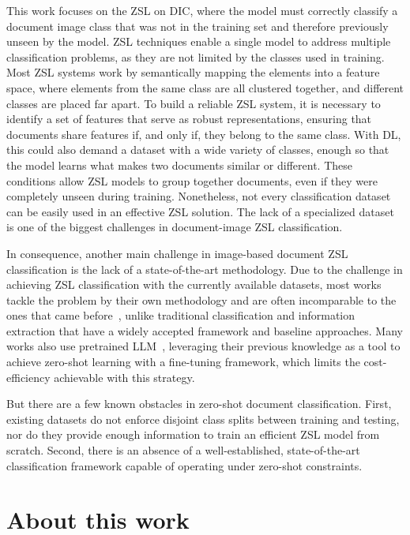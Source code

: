 This work focuses on the \gls{ZSL} on \gls{DIC}, where the model must correctly classify a document image class that was not in the training set and therefore previously unseen by the model. \gls{ZSL} techniques enable a single model to address multiple classification problems, as they are not limited by the classes used in training. Most \gls{ZSL} systems work by semantically mapping the elements into a feature space, where elements from the same class are all clustered together, and different classes are placed far apart. To build a reliable \gls{ZSL} system, it is necessary to identify a set of features that serve as robust representations, ensuring that documents share features if, and only if, they belong to the same class. With \gls{DL}, this could also demand a dataset with a wide variety of classes, enough so that the model learns what makes two documents similar or different. These conditions allow \gls{ZSL} models to group together documents, even if they were completely unseen during training. Nonetheless, not every classification dataset can be easily used in an effective \gls{ZSL} solution. The lack of a specialized dataset is one of the biggest challenges in document-image \gls{ZSL} classification.

In consequence, another main challenge in image-based document \gls{ZSL} classification is the lack of a state-of-the-art methodology. Due to the challenge in achieving \gls{ZSL} classification with the currently available datasets, most works tackle the problem by their own methodology and are often incomparable to the ones that came before~\cite{sinha2024cica}, unlike traditional classification and information extraction that have a widely accepted framework and baseline approaches. Many works also use pretrained \gls{LLM}~\cite{scius2024zeroshot}, leveraging their previous knowledge as a tool to achieve zero-shot learning with a fine-tuning framework, which limits the cost-efficiency achievable with this strategy.

But there are a few known obstacles in zero-shot document classification. First, existing datasets do not enforce disjoint class splits between training and testing, nor do they provide enough information to train an efficient \gls{ZSL} model from scratch. Second, there is an absence of a well-established, state-of-the-art classification framework capable of operating under zero-shot constraints.

\section{About this work}

